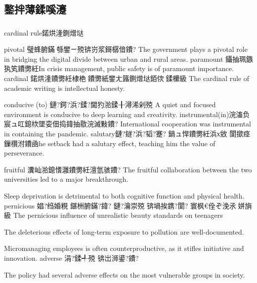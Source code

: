﻿\documentclass[lang=cn,11pt]{elegantbook}
\begin{document}
\subsection{鐜拌薄鍒嗘瀽}

\subsubsection{}

cardinal rule鍩烘湰鍘熷垯


pivotal 璧蜂腑鏋綔鐢ㄧ殑锛岃浆鎶樼偣鐨?
The government plays a pivotal role in bridging the digital divide between urban and rural areas.
paramount 鑷抽珮鏃犱笂鐨勶紝In crisis management, public safety is of paramount importance.
cardinal 鍩烘湰鐨勶紝棣栬鐨勶紙鐢ㄤ簬鍘熷垯銆佽鍒欙級
The cardinal rule of academic writing is intellectual honesty.

conducive (to) 鏈?鍔?浜?鍒?閫犳湁鍒╂潯浠剁殑
A quiet and focused environment is conducive to deep learning and
creativity.
instrumental(in)浣滀负宸ュ叿鎴栨墜娈佃捣鍏抽敭浣滅敤鐨?
International cooperation was instrumental in containing the pandemic.
salutary鏈?鐩?浜?韬?蹇?
鍋ュ悍鐨勶紝浜х敓
閬撳痉鏁欑泭鐨凾he setback had a salutary effect, teaching him the value of perseverance.

fruitful 瀵屾湁鎴愭灉鐨勶紝澶氫骇鐨?
The fruitful collaboration between the two universities led to a major
breakthrough.


Sleep deprivation is detrimental to both cognitive function and physical health.
pernicious 娼?绉婚粯 鍖栦腑鏋?鍏?
鏈?瀹崇殑 锛堝挨鎸?閬?
寰枫€佺ぞ浼氶姘旓級
The pernicious influence of unrealistic beauty standards on teenagers

The deleterious effects of long-term exposure to pollution are well-documented.


Micromanaging employees is often counterproductive, as it stifles initiative and innovation.
adverse 涓?鍒╃殑 锛岀浉鍙?鐨?




The policy had several adverse effects on the most vulnerable groups in society.
\end{document}
